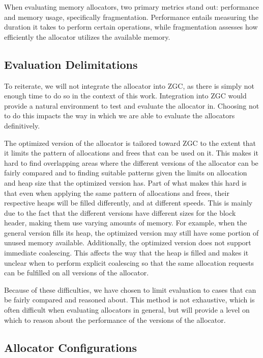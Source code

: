 
When evaluating memory allocators, two primary metrics stand out: performance and memory usage, specifically fragmentation. Performance entails measuring the duration it takes to perform certain operations, while fragmentation assesses how efficiently the allocator utilizes the available memory.

\subsection{Evaluation Delimitations}

To reiterate, we will not integrate the allocator into ZGC, as there is simply not enough time to do so in the context of this work. Integration into ZGC would provide a natural environment to test and evaluate the allocator in. Choosing not to do this impacts the way in which we are able to evaluate the allocators definitively.

The optimized version of the allocator is tailored toward ZGC to the extent that it limits the pattern of allocations and frees that can be used on it. This makes it hard to find overlapping areas where the different versions of the allocator can be fairly compared and to finding suitable patterns given the limits on allocation and heap size that the optimized version has. Part of what makes this hard is that even when applying the same pattern of allocations and frees, their respective heaps will be filled differently, and at different speeds. This is mainly due to the fact that the different versions have different sizes for the block header, making them use varying amounts of memory. For example, when the general version fills its heap, the optimized version may still have some portion of unused memory available. Additionally, the optimized version does not support immediate coalescing. This affects the way that the heap is filled and makes it unclear when to perform explicit coalescing so that the same allocation requests can be fulfilled on all versions of the allocator.

Because of these difficulties, we have chosen to limit evaluation to cases that can be fairly compared and reasoned about. This method is not exhaustive, which is often difficult when evaluating allocators in general, but will provide a level on which to reason about the performance of the versions of the allocator.

\subsection{Allocator Configurations}

